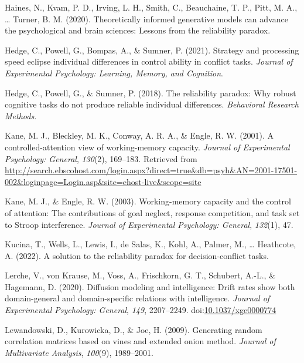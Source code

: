 \documentclass[
  ,man]{apa6}
\newlength{\cslhangindent}
\newlength{\cslentryspacingunit} %
\newenvironment{CSLReferences}[2] %
 {%
  \setlength{\parindent}{0pt}
  \ifodd #1
  \let\oldpar\par
  \def\par{\hangindent=\cslhangindent\oldpar}
  \fi
  \setlength{\parskip}{#2\cslentryspacingunit}
 }%
 {}
\begin{document}
\begin{CSLReferences}{1}{0}
\leavevmode{}%
Haines, N., Kvam, P. D., Irving, L. H., Smith, C., Beauchaine, T. P., Pitt, M. A., \ldots{} Turner, B. M. (2020). Theoretically informed generative models can advance the psychological and brain sciences: {Lessons} from the reliability paradox.

\leavevmode{}%
Hedge, C., Powell, G., Bompas, A., \& Sumner, P. (2021). Strategy and processing speed eclipse individual differences in control ability in conflict tasks. \emph{Journal of Experimental Psychology: Learning, Memory, and Cognition}.

\leavevmode{}%
Hedge, C., Powell, G., \& Sumner, P. (2018). The reliability paradox: {Why} robust cognitive tasks do not produce reliable individual differences. \emph{Behavioral Research Methods}.

\leavevmode{}%
Kane, M. J., Bleckley, M. K., Conway, A. R. A., \& Engle, R. W. (2001). A controlled-attention view of working-memory capacity. \emph{Journal of Experimental Psychology: General}, \emph{130}(2), 169--183. Retrieved from \url{http://search.ebscohost.com/login.aspx?direct=true\&db=psyh\&AN=2001-17501-002\&loginpage=Login.asp\&site=ehost-live\&scope=site}

\leavevmode{}%
Kane, M. J., \& Engle, R. W. (2003). Working-memory capacity and the control of attention: The contributions of goal neglect, response competition, and task set to {Stroop} interference. \emph{Journal of Experimental Psychology: General}, \emph{132}(1), 47.

\leavevmode{}%
Kucina, T., Wells, L., Lewis, I., de Salas, K., Kohl, A., Palmer, M., \ldots{} Heathcote, A. (2022). A solution to the reliability paradox for decision-conflict tasks.

\leavevmode{}%
Lerche, V., von Krause, M., Voss, A., Frischkorn, G. T., Schubert, A.-L., \& Hagemann, D. (2020). Diffusion modeling and intelligence: {Drift} rates show both domain-general and domain-specific relations with intelligence. \emph{Journal of Experimental Psychology: General}, \emph{149}, 2207--2249. doi:\href{https://doi.org/10.1037/xge0000774}{10.1037/xge0000774}

\leavevmode{}%
Lewandowski, D., Kurowicka, D., \& Joe, H. (2009). Generating random correlation matrices based on vines and extended onion method. \emph{Journal of Multivariate Analysis}, \emph{100}(9), 1989--2001.


\end{CSLReferences}
\end{document}
